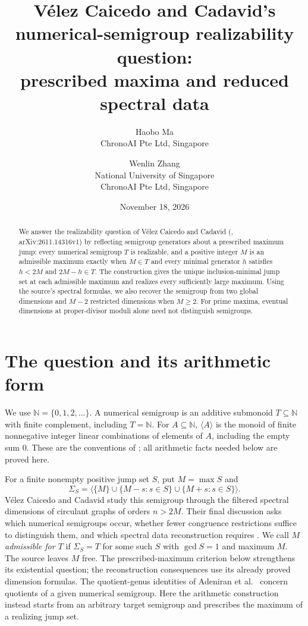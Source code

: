 \documentclass[11pt]{article}
\title{V\'elez Caicedo and Cadavid's numerical-semigroup realizability question:\\prescribed maxima and reduced spectral data}
\author{Haobo Ma\\\small ChronoAI Pte Ltd, Singapore
\and Wenlin Zhang\\\small National University of Singapore\\\small ChronoAI Pte Ltd, Singapore}
\date{November 18, 2026}
\newcommand{\N}{\mathbb N}
\newcommand{\gen}[1]{\langle #1\rangle}
\begin{document}
\maketitle
\begin{abstract}
We answer the realizability question of V\'elez Caicedo and Cadavid
(\cite[\S5, p.~17, second paragraph]{VC}, arXiv:2611.14316v1) by reflecting
semigroup generators about a prescribed maximum jump: every numerical
semigroup $T$ is realizable, and a positive integer $M$ is an admissible maximum
exactly when $M\in T$ and every minimal generator $h$ satisfies
$h<2M$ and $2M-h\in T$.
The construction gives the unique inclusion-minimal jump set at each
admissible maximum and realizes every sufficiently large maximum.
Using the source's spectral formulas, we also recover the semigroup from
two global dimensions and $M-2$ restricted dimensions when $M\ge2$.
For prime maxima, eventual dimensions at proper-divisor moduli alone need
not distinguish semigroups.
\end{abstract}

\section{The question and its arithmetic form}
We use $\N=\{0,1,2,\ldots\}$. A numerical semigroup is an additive submonoid
$T\subseteq\N$ with finite complement, including $T=\N$.
For $A\subseteq\N$, $\gen A$ is the monoid of finite nonnegative integer
linear combinations of elements of $A$, including the empty sum $0$.
These are the conventions of \cite{RG}; all arithmetic facts needed below
are proved here.

For a finite nonempty positive jump set $S$, put $M=\max S$ and
\[
 \Sigma_S=\gen{\{M\}\cup\{M-s:s\in S\}\cup\{M+s:s\in S\}}.
\]
V\'elez Caicedo and Cadavid study this semigroup through the filtered
spectral dimensions of circulant graphs of orders $n>2M$.
Their final discussion asks which numerical semigroups occur, whether
fewer congruence restrictions suffice to distinguish them, and which
spectral data reconstruction requires \cite[\S5, p.~17]{VC}.
We call $M$ \emph{admissible for $T$} if $\Sigma_S=T$ for some such $S$
with $\gcd S=1$ and maximum $M$.
The source leaves $M$ free. The prescribed-maximum criterion below
strengthens its existential question; the reconstruction consequences use
its already proved dimension formulas.
The quotient-genus identities of Adeniran et al.\ \cite[Theorem 1.3]{AB}
concern quotients of a given numerical semigroup. Here the arithmetic
construction instead starts from an arbitrary target semigroup and
prescribes the maximum of a realizing jump set.
\end{document}
